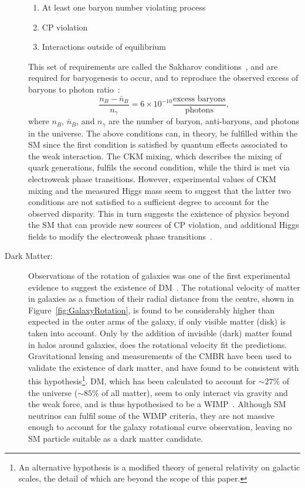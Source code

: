 \begin{description}
	\begin{enumerate}
	\item At least one baryon number violating process
	\item CP violation
	\item Interactions outside of equilibrium
	\end{enumerate}
	This set of requirements are called the Sakharov conditions~\cite{Sakharov_1991}, and are required for baryogenesis to occur, and to reproduce the observed excess of baryons to photon ratio~\cite{KUZMIN198536,Jarosik_2011}:
		\begin{equation}
		\frac{n_B-\bar{n}_B}{n_{\gamma}}=6\times10^{-10}\frac{\textrm{excess baryons}}{\textrm{photons}},
		\end{equation}
		where $n_B$, $\bar{n}_B$, and $n_{\gamma}$ are the number of baryon, anti-baryons, and photons in the universe. The above  conditions can, in theory, be fulfilled within the \ac{SM} since the first condition is satisfied by quantum effects associated to the weak interaction. The \ac{CKM} mixing, which describes the mixing of quark generations, fulfils the second condition, while the third is met via electroweak phase transitions.
		 However, experimental values of \ac{CKM} mixing and the measured Higgs mass seem to suggest that the latter two conditions are not satisfied to a sufficient degree to account for the observed disparity. This in turn suggests the existence of physics beyond the \ac{SM} that can provide new sources of CP violation, and additional Higgs fields to modify the electroweak phase transitions~\cite{CARENA2001158}.
		 
	\item[Dark Matter:] Observations of the rotation of galaxies was one of the first experimental evidence to suggest the existence of \ac{DM}~\cite{Rubin1970}. The rotational velocity of matter in galaxies as a function of their radial distance from the centre, shown in Figure~\ref{fig:GalaxyRotation}, is found to be considerably higher than expected in the outer arms of the galaxy, if only visible matter (disk) is taken into account. 
	Only by the addition of invisible (dark) matter found in halos around galaxies, does the rotational velocity fit the predictions. Gravitational lensing and measurements of the \ac{CMBR} have been used to validate the existence of dark matter, and have found to be consistent with this hypothesis\footnote{An alternative hypothesis is a modified theory of general relativity on galactic scales, the detail of which are beyond the scope of this paper.}.
	\ac{DM}, which has been calculated to account for $\sim27\%$ of the universe ($\sim85\%$ of all matter), seem to only interact via gravity and the weak force, and is thus hypothesised to be a \ac{WIMP}~\cite{Jarosik_2011,Bradac:2008eu,Ade:2013zuv,oro44361}. Although \ac{SM} neutrinos can fulfil some of the \ac{WIMP} criteria, they are not massive enough to account for the galaxy rotational curve observation, leaving no \ac{SM} particle suitable as a dark matter candidate.
	\GalaxyRotation
	\end{description}

